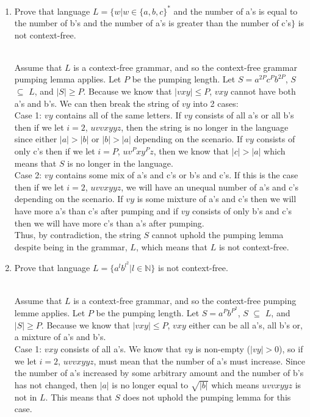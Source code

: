 \documentclass[11pt]{article}
\theoremstyle{definition}
\theoremstyle{theorem}
\newcommand{\solution}{\medskip\noindent{\color{blue}\textbf{Solution:}}}
\begin{document}
\begin{enumerate}[label=(\alph*)]
\begin{enumerate}[label=(\alph*)]
\item Prove that language $L = \{w | w \in \{a,b,c\}^*$ and the number of a's is equal to the number of b's and the number of a's is greater than the number of c's$\}$ is not context-free.

\solution \\
Assume that $L$ is a context-free grammar, and so the context-free grammar pumping lemma applies. Let $P$ be the pumping length. Let $S = a^{2P}c^{P}b^{2P}$,  $S$ $\subseteq$ $L$, and $|S| \geq P$. Because we know that $|vxy| \leq P$, $vxy$ cannot have both a's and b's. We can then break the string of $vy$ into 2 cases: \\

Case 1: $vy$ contains all of the same letters. If $vy$ consists of all a's or all b's then if we let $i = 2$, $uvvxyyz$, then the string is no longer in the language since either $|a| > |b|$ or $|b| > |a|$ depending on the scenario. If $vy$ consists of only c's then if we let $i = P$, $uv^Pxy^Pz$, then we know that $|c| > |a|$ which means that $S$ is no longer in the language. \\ 

Case 2: $vy$ contains some mix of a's and c's or b's and c's. If this is the case then if we let $i = 2$, $uvvxyyz$, we will have an unequal number of a's and c's depending on the scenario. If $vy$ is some mixture of a's and c's then we will have more a's than c's after pumping and if $vy$ consists of only b's and c's then we will have more c's than a's after pumping. \\

Thus, by contradiction, the string $S$ cannot uphold the pumping lemma despite being in the grammar, $L$, which means that $L$ is not context-free.
\item Prove that language $L = \{a^l b^{l^2} | l \in \mathbb{N}\}$ is not context-free.

\solution \\
Assume that $L$ is a context-free grammar, and so the context-free pumping lemme applies. Let $P$ be the pumping length. Let $S = a^Pb^{P^2}$, $S$ $\subseteq$ $L$, and $|S| \geq P$. Because we know that $|vxy| \leq P$, $vxy$ either can be all a's, all b's or, a mixture of a's and b's. \\

Case 1: $vxy$ consists of all a's. We know that $vy$ is non-empty ($|vy| > 0$), so if we let $i = 2$, $uvvxyyz$, must mean that the number of a's must increase. Since the number of a's increased by some arbitrary amount and the number of b's has not changed, then $|a|$ is no longer equal to $\sqrt{|b|}$ which means $uvvxyyz$ is not in $L$. This means that $S$ does not uphold the pumping lemma for this case. \\


\end{enumerate}
\end{enumerate}
\end{document}
